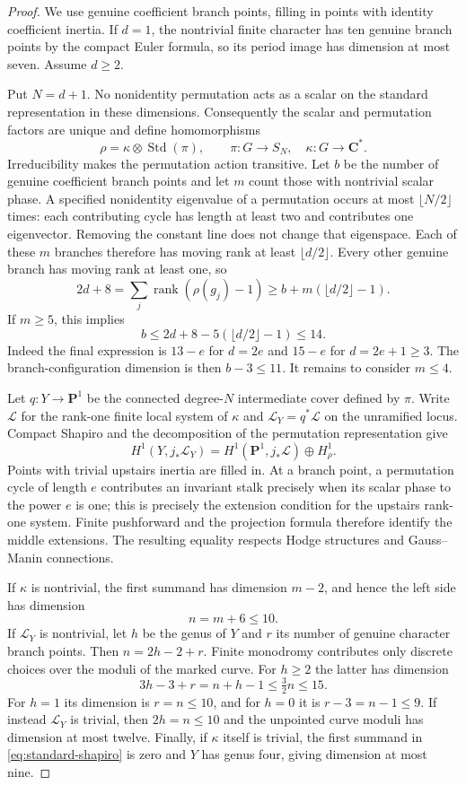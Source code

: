 \documentclass[11pt]{article}
\theoremstyle{definition}
\theoremstyle{remark}
\newcommand{\C}{\mathbf C}
\begin{document}
\begin{proof}
We use genuine coefficient branch points, filling in points with
identity coefficient inertia. If $d=1$, the nontrivial finite
character has ten genuine branch points by the compact Euler formula,
so its period image has dimension at most seven. Assume $d\ge2$.

Put $N=d+1$. No nonidentity permutation acts as a scalar on the
standard representation in these dimensions. Consequently the
scalar and permutation factors are unique and define homomorphisms
\[
 \rho=\kappa\otimes\operatorname{Std}(\pi),\qquad
 \pi:G\longrightarrow S_N,\quad
 \kappa:G\longrightarrow\C^*.
\]
Irreducibility makes the permutation action transitive.
Let $b$ be the number of genuine coefficient branch points and
let $m$ count those with nontrivial scalar phase. A specified
nonidentity eigenvalue of a permutation occurs at most
$\lfloor N/2\rfloor$ times: each contributing cycle has length at
least two and contributes one eigenvector. Removing the constant
line does not change that eigenspace. Each of these $m$ branches
therefore has moving rank at least $\lfloor d/2\rfloor$.
Every other genuine branch has moving rank at least one, so
\[
 2d+8=\sum_j\operatorname{rank}(\rho(g_j)-1)
 \ge b+m(\lfloor d/2\rfloor-1).
\]
If $m\ge5$, this implies
\[
 b\le2d+8-5(\lfloor d/2\rfloor-1)\le14.
\]
Indeed the final expression is $13-e$ for $d=2e$ and $15-e$
for $d=2e+1\ge3$. The branch-configuration dimension is then
$b-3\le11$. It remains to consider $m\le4$.

Let $q:Y\to\mathbf P^1$ be the connected degree-$N$ intermediate
cover defined by $\pi$. Write $\mathcal L$ for the rank-one finite
local system of $\kappa$ and $\mathcal L_Y=q^*\mathcal L$ on the
unramified locus. Compact Shapiro and the decomposition of the
permutation representation give
\begin{equation}\label{eq:standard-shapiro}
 H^1(Y,j_*\mathcal L_Y)
 =H^1(\mathbf P^1,j_*\mathcal L)\oplus H^1_\rho.
\end{equation}
Points with trivial upstairs inertia are filled in. At a branch
point, a permutation cycle of length $e$ contributes an invariant
stalk precisely when its scalar phase to the power $e$ is one;
this is precisely the extension condition for the upstairs
rank-one system. Finite pushforward and the projection formula
therefore identify the middle extensions. The resulting equality
respects Hodge structures and Gauss--Manin connections.

If $\kappa$ is nontrivial, the first summand has dimension $m-2$,
and hence the left side has dimension
\[
 n=m+6\le10.
\]
If $\mathcal L_Y$ is nontrivial, let $h$ be the genus of $Y$ and
$r$ its number of genuine character branch points. Then
$n=2h-2+r$. Finite monodromy contributes only discrete choices
over the moduli of the marked curve. For $h\ge2$ the latter has
dimension
\[
 3h-3+r=n+h-1\le\tfrac32n\le15.
\]
For $h=1$ its dimension is $r=n\le10$, and for $h=0$ it is
$r-3=n-1\le9$. If instead $\mathcal L_Y$ is trivial, then
$2h=n\le10$ and the unpointed curve moduli has dimension at most
twelve. Finally, if $\kappa$ itself is trivial, the first summand
in \eqref{eq:standard-shapiro} is zero and $Y$ has genus four,
giving dimension at most nine.


\end{proof}
\end{document}
